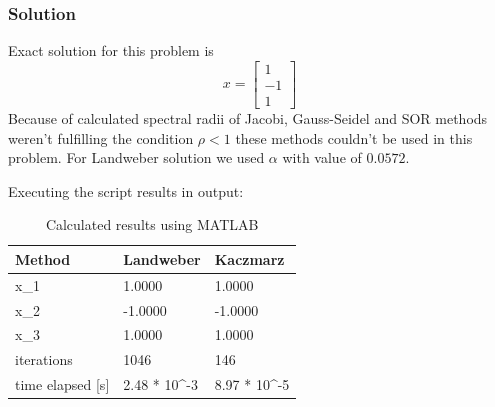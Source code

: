 \subsubsection*{Solution}
Exact solution for this problem is 
\begin{equation*}
  x =
  \begin{bmatrix}
    1 \\
    -1 \\
    1
  \end{bmatrix}
\end{equation*} 
Because of calculated spectral radii of Jacobi, Gauss-Seidel and SOR methods weren't fulfilling the condition $\rho < 1$ these methods couldn't be used in this problem.
For Landweber solution we used $\alpha$ with value of $0.0572$.

Executing the script results in output:

\begin{table}[H]
  \centering
  \caption{Calculated results using MATLAB}
  \label{tab:my-table}
  \begin{tabular}{|l|l|l|}
  \hline
  Method               & Landweber                     & Kaczmarz                      \\ \hline
  x\_1                 & 1.0000                        & 1.0000                        \\ \hline
  x\_2                 & -1.0000                       & -1.0000                       \\ \hline
  x\_3                 & 1.0000                        & 1.0000                        \\ \hline
  iterations           & 1046                          & 146                           \\ \hline
  time elapsed {[}s{]} & 2.48 * 10\textasciicircum{}-3 & 8.97 * 10\textasciicircum{}-5 \\ \hline
  \end{tabular}
  \end{table}

